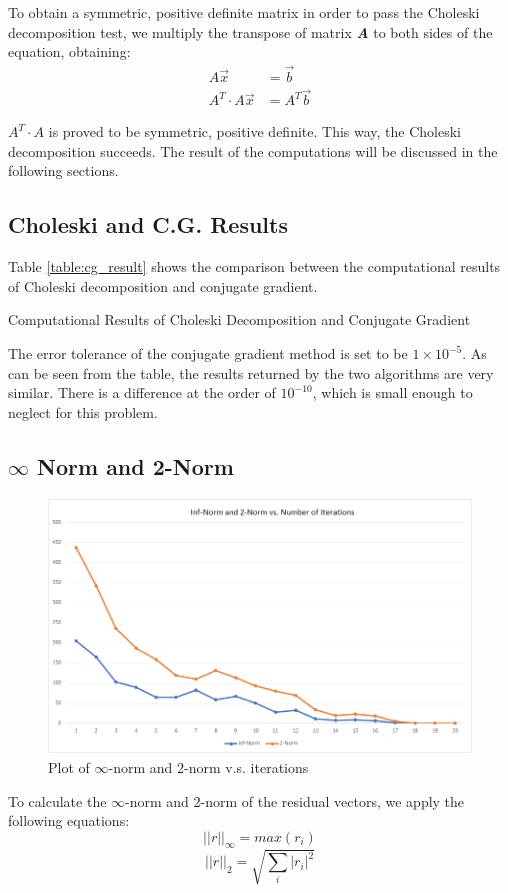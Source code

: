 \documentclass[a4paper,titlepage]{article}
\begin{document}
				To obtain a symmetric, positive definite matrix in order to pass the Choleski decomposition test, we multiply the transpose of matrix \textbf{\textit{A}} to both sides of the equation, obtaining:
				\begin{align*}
					A\vec{x} &= \vec{b}\\
					A^T \cdot A\vec{x} &= A^T\vec{b}
				\end{align*}
				
				$A^T \cdot A$ is proved to be symmetric, positive definite. This way, the Choleski decomposition succeeds. The result of the computations will be discussed in the following sections. 
			\subsection{Choleski and C.G. Results}	
				Table \ref{table:cg_result} shows the comparison between the computational results of Choleski decomposition and conjugate gradient.			
				\begin{table}[!htb]
					\centering
					\caption{Computational Results of Choleski Decomposition and Conjugate Gradient}
					\label{table:cg_result}
				\end{table}
			
				The error tolerance of the conjugate gradient method is set to be $1\times 10^{-5}$. As can be seen from the table, the results returned by the two algorithms are very similar. There is a difference at the order of $10^{-10}$, which is small enough to neglect for this problem.
			\subsection{$\infty$ Norm and 2-Norm}
				\begin{figure}[H]
					\centering
					\includegraphics[width=0.7\linewidth]{two_norm_plot}
					\caption{Plot of $\infty$-norm and $2$-norm v.s. iterations}
					\label{two_norm_plot}
				\end{figure}	
				To calculate the $\infty$-norm and 2-norm of the residual vectors, we apply the following equations:
				\begin{equation}
					||r||_{\infty} = max(r_i)
				\end{equation}
				\begin{equation}
					||r||_2 = \sqrt{\sum_{i} |r_i|^2}
				\end{equation}
				
\end{document}
